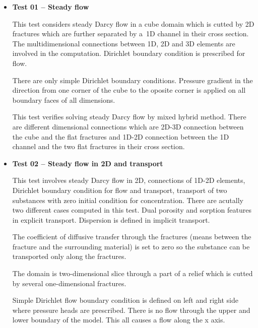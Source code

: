 \documentclass[12pt,a4paper]{report}
\begin{document}
\begin{itemize}

\item \textbf{Test 01 -- Steady flow}

This test considers steady Darcy flow in a cube domain which is cutted by 2D fractures which are further separated by a~1D channel in their cross section. The multidimensional connections between 1D, 2D and 3D elements are involved in the computation. Dirichlet boundary condition is prescribed for flow.

There are only simple Dirichlet boundary conditions. Pressure gradient in the direction from one corner of the cube to the oposite corner is applied on all boundary faces of all dimensions.

This test verifies solving steady Darcy flow by mixed hybrid method. There are different dimensional connections which are 2D-3D connection between the cube and the flat fractures and 1D-2D connection between the 1D channel and the two flat fractures in their cross section.



\item \textbf{Test 02 -- Steady flow in 2D and transport}

This test involves steady Darcy flow in 2D, connections of 1D-2D elements, Dirichlet boundary condition for flow and transport, transport of two substances with zero initial condition for concentration. 
There are acutally two different cases computed in this test. Dual porosity and sorption features in explicit transport. Dispersion is defined in implicit transport.

The coefficient of diffusive transfer through the fractures (means between the fracture and the surrounding material) is set to zero so the substance can be transported only along the fractures.

The domain is two-dimensional slice through a part of a relief which is cutted by several one-dimensional fractures.

Simple Dirichlet flow boundary condition is defined on left and right side where pressure heads are prescribed. There is no flow through the upper and lower boundary of the model. This all causes a flow along the x axis.


\end{itemize}
\end{document}
